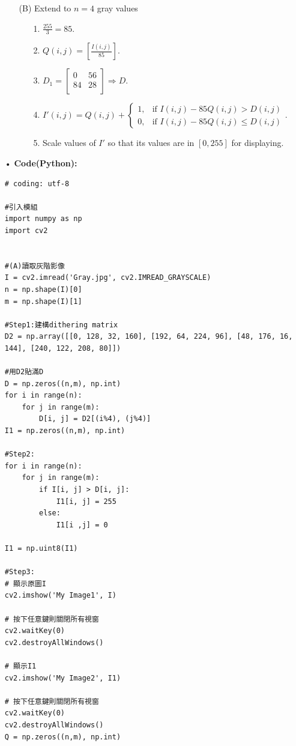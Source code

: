 \documentclass[12pt,a4paper]{article}
\begin{document}
\begin{enumerate}
\begin{enumerate}
\item[(B)]Extend to $n = 4$ gray values
\begin{enumerate}
\item[1.]$\displaystyle \frac{255}{3} = 85$.
\item[2.]$Q(i,j)=
\left[\displaystyle\frac{I(i,j)}{85}\right].$\\
\item[3.]$D_1 = \left[
\begin{array}{cc}
0 & 56\\
84 & 28\\
\end{array}             
\right]
\Longrightarrow D.$
\item[4.]$I'(i, j) = Q(i,j)+\begin{cases}
1, & \text{if } I(i,j)-85Q(i,j)>D(i,j)\\
0, & \text{if } I(i,j)-85Q(i,j)\leq D(i,j)
\end{cases}$.
\item[5.]Scale values of $I'$ so that
its values are in $[0, 255]$ for displaying.
\end{enumerate}
\end{enumerate}

\newpage
\item[•]
{\bf Code(Python):}
\begin{lstlisting}
# coding: utf-8

#引入模組
import numpy as np
import cv2


#(A)讀取灰階影像
I = cv2.imread('Gray.jpg', cv2.IMREAD_GRAYSCALE)
n = np.shape(I)[0]
m = np.shape(I)[1]

#Step1:建構dithering matrix
D2 = np.array([[0, 128, 32, 160], [192, 64, 224, 96], [48, 176, 16, 144], [240, 122, 208, 80]])

#用D2貼滿D
D = np.zeros((n,m), np.int)
for i in range(n):
    for j in range(m):
        D[i, j] = D2[(i%4), (j%4)]
I1 = np.zeros((n,m), np.int)

#Step2:
for i in range(n):
    for j in range(m):
        if I[i, j] > D[i, j]:
            I1[i, j] = 255
        else:
            I1[i ,j] = 0

I1 = np.uint8(I1)

#Step3:
# 顯示原圖I
cv2.imshow('My Image1', I)

# 按下任意鍵則關閉所有視窗
cv2.waitKey(0)
cv2.destroyAllWindows()

# 顯示I1
cv2.imshow('My Image2', I1)

# 按下任意鍵則關閉所有視窗
cv2.waitKey(0)
cv2.destroyAllWindows()
Q = np.zeros((n,m), np.int)



\end{lstlisting}
\end{enumerate}
\end{document}
